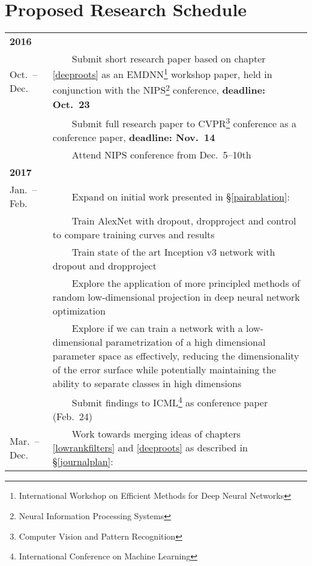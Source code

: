 \documentclass[thesis]{subfiles}
\begin{document}
\section{Proposed Research Schedule}

\newcommand{\tabitem}{~~\llap{\textbullet}~~}
\newcommand{\tabtabitem}{~~\llap{\textendash}~~}
\begin{tabularx}{\textwidth}{lX}
\multicolumn{2}{l}{\textbf{2016}}\\ \cline{1-2}
Oct.\ -- Dec. & \tabitem Submit short research paper based on chapter \ref{deeproots} as an EMDNN\footnote{International Workshop on Efficient Methods for Deep Neural Networks} workshop paper, held in conjunction with the NIPS\footnote{Neural Information Processing Systems} conference, \textbf{deadline: Oct.\ 23}\\
& \tabitem Submit full research paper to CVPR\footnote{Computer Vision and Pattern Recognition} conference as a conference paper, \textbf{deadline: Nov.\ 14}\\
& \tabitem Attend NIPS conference from Dec.\ 5--10th\\
\multicolumn{2}{l}{\textbf{2017}}\\ \cline{1-2}
Jan.\ -- Feb.& \tabitem Expand on initial work presented in \S\ref{pairablation}:\\
& \tabtabitem Train AlexNet with dropout, dropproject and control to compare training curves and results\\
& \tabtabitem Train state of the art Inception v3 network with dropout and dropproject\\
& \tabtabitem Explore the application of more principled methods of random low-dimensional projection in deep neural network optimization\\
& \tabtabitem Explore if we can train a network with a low-dimensional parametrization of a high dimensional parameter space as effectively, reducing the dimensionality of the error surface while potentially maintaining the ability to separate classes in high dimensions\\
& \tabitem Submit findings to ICML\footnote{International Conference on Machine Learning} as conference paper (Feb.\ 24)\\
Mar.\ -- Dec.& \tabitem Work towards merging ideas of chapters \ref{lowrankfilters} and \ref{deeproots} as described in \S\ref{journalplan}:\\

\end{tabularx}
\end{document}

